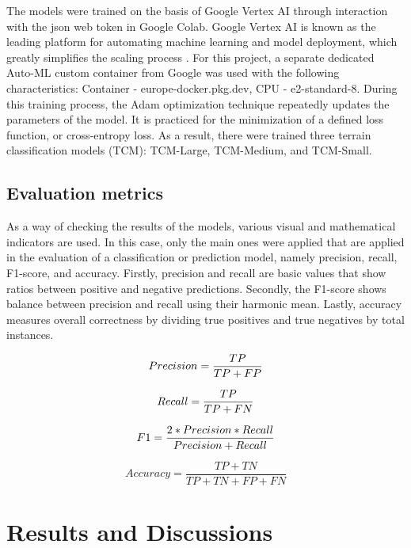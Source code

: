 \documentclass[conference]{IEEEtran}
\begin{document}
The models were trained on the basis of Google Vertex AI through interaction with the json web token in Google Colab. Google Vertex AI is known as the leading platform for automating machine learning and model deployment, which greatly simplifies the scaling process \cite{b11}. For this project, a separate dedicated Auto-ML custom container from Google was used with the following characteristics: Container - europe-docker.pkg.dev, CPU - e2-standard-8. During this training process, the Adam optimization technique repeatedly updates the parameters of the model. It is practiced for the minimization of a defined loss function, or cross-entropy loss. As a result, there were trained three terrain classification models (TCM): TCM-Large, TCM-Medium, and TCM-Small.

\subsection{Evaluation metrics}
As a way of checking the results of the models, various visual and mathematical indicators are used. In this case, only the main ones were applied that are applied in the evaluation of a classification or prediction model, namely precision, recall, F1-score, and accuracy. Firstly, precision and recall are basic values that show ratios between positive and negative predictions. Secondly, the F1-score shows balance between precision and recall using their harmonic mean. Lastly, accuracy measures overall correctness by dividing true positives and true negatives by total instances.

\begin{equation}
Precision = \frac{TP}{TP+FP} \\[5pt]
\end{equation}

\begin{equation}
Recall = \frac{TP}{TP+FN} \\[5pt]
\end{equation}

\begin{equation}
F1 = \frac{2*Precision*Recall}{Precision+Recall} \\[5pt]
\end{equation}

\begin{equation}
Accuracy = \frac{TP+TN}{TP+TN+FP+FN}
\end{equation}

\section{Results and Discussions}
\end{document}
